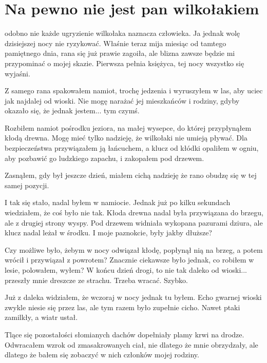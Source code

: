 \chapter{Na pewno nie jest pan wilkołakiem} 


odobno nie każde ugryzienie wilkołaka naznacza człowieka.
Ja jednak wolę dzisiejszej nocy nie ryzykować.
Właśnie teraz mija miesiąc od tamtego pamiętnego dnia, rana się już prawie zagoiła, ale blizna zawsze będzie mi przypominać o mojej skazie.
Pierwsza pełnia księżyca, tej nocy wszystko się wyjaśni.

Z samego rana spakowałem namiot, trochę jedzenia i wyruszyłem w las, aby uciec jak najdalej od wioski.
Nie mogę narażać jej mieszkańców i rodziny, gdyby okazało się, że jednak jestem... tym czymś.

Rozbiłem namiot pośrodku jeziora, na małej wysepce, do której przypłynąłem kłodą drewna. 
Mogę mieć tylko nadzieję, że wilkołaki nie umieją pływać.
Dla bezpieczeństwa przywiązałem ją łańcuchem, a klucz od kłódki opaliłem w ogniu, aby pozbawić go ludzkiego zapachu, i zakopałem pod drzewem.

Zasnąłem, gdy był jeszcze dzień, miałem cichą nadzieję że rano obudzę się w tej samej pozycji.

\divider{}

I tak się stało, nadal byłem w namiocie. Jednak już po kilku sekundach wiedziałem, że coś było nie tak.
Kłoda drewna nadal była przywiązana do brzegu, ale z drugiej strony wyspy.
Pod drzewem widniała wykopana pazurami dziura, ale klucz nadal leżał w środku.
I moje paznokcie, były jakby dłuższe?

Czy możliwe było, żebym w nocy odwiązał kłodę, popłynął nią na brzeg, a potem wrócił i przywiązał z powrotem?
Znacznie ciekawsze było jednak, co robiłem w lesie, polowałem, wyłem? 
W końcu dzień drogi, to nie tak daleko od wioski... przeszły mnie dreszcze ze strachu.
Trzeba wracać. Szybko.

\divider{}

Już z daleka widziałem, że wczoraj w nocy jednak tu byłem.
Echo gwarnej wioski zwykle niesie się przez las, ale tym razem było zupełnie cicho.
Nawet ptaki zamilkły, a wiatr ustał.

Tlące się pozostałości słomianych dachów dopełniały plamy krwi na drodze.
Odwracałem wzrok od zmasakrowanych ciał, nie dlatego że mnie obrzydzały, ale dlatego że bałem się zobaczyć w nich członków mojej rodziny.

